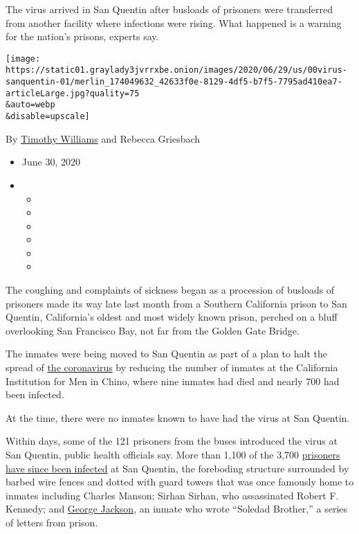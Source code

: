 The virus arrived in San Quentin after busloads of prisoners were
transferred from another facility where infections were rising. What
happened is a warning for the nation's prisons, experts say.

\texttt{[image: https://static01.graylady3jvrrxbe.onion/images/2020/06/29/us/00virus-sanquentin-01/merlin\_174049632\_42633f0e-8129-4df5-b7f5-7795ad410ea7-articleLarge.jpg?quality=75\\\&auto=webp\\\&disable=upscale]}

By \href{https://www.nytimes3xbfgragh.onion/by/timothy-williams}{Timothy
Williams} and Rebecca Griesbach

\begin{itemize}
\item
  June 30, 2020
\item
  \begin{itemize}
  \item
  \item
  \item
  \item
  \item
  \item
  \end{itemize}
\end{itemize}

The coughing and complaints of sickness began as a procession of
busloads of prisoners made its way late last month from a Southern
California prison to San Quentin, California's oldest and most widely
known prison, perched on a bluff overlooking San Francisco Bay, not far
from the Golden Gate Bridge.

The inmates were being moved to San Quentin as part of a plan to halt
the spread of
\href{https://www.nytimes3xbfgragh.onion/news-event/coronavirus}{the
coronavirus} by reducing the number of inmates at the California
Institution for Men in Chino, where nine inmates had died and nearly 700
had been infected.

At the time, there were no inmates known to have had the virus at San
Quentin.

Within days, some of the 121 prisoners from the buses introduced the
virus at San Quentin, public health officials say. More than 1,100 of
the 3,700
\href{https://www.nytimes3xbfgragh.onion/2020/07/30/nyregion/New-jersey-inmate-release-Covid.html}{prisoners
have since been infected} at San Quentin, the foreboding structure
surrounded by barbed wire fences and dotted with guard towers that was
once famously home to inmates including Charles Manson; Sirhan Sirhan,
who assassinated Robert F. Kennedy; and
\href{https://www.nytimes3xbfgragh.onion/1971/08/22/archives/-soledad-brother-and-5-are-killed-in-prison-battle-george-jackson.html}{George
Jackson}, an inmate who wrote ``Soledad Brother,'' a series of letters
from prison.

